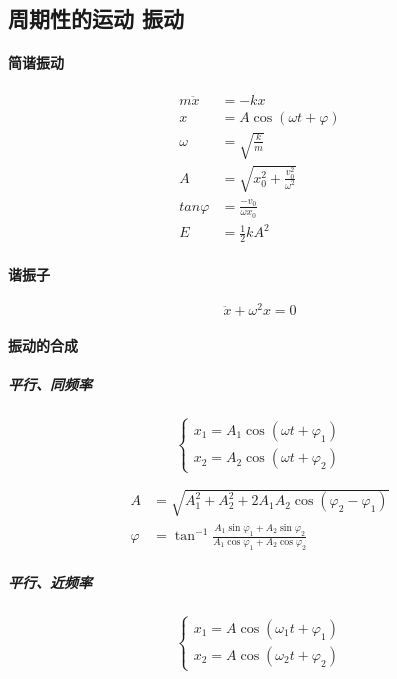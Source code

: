 \documentclass[12pt,a4paper]{article}
\numberwithin{equation}{section}
\begin{document}
\begin{CJK}{UTF8}{gbsn}
\section{周期性的运动 振动}
\paragraph{简谐振动}
\begin{align}
  m\ddot{x} &=-kx \\
  x&=A\cos(\omega t+\varphi) \\
  \omega &= \sqrt{\frac{k}{m}} \\
  A &= \sqrt{x_0^2+\frac{v_0^2}{\omega^2}} \\
  tan\varphi &= \frac{-v_0}{\omega x_0} \\
  E&=\frac{1}{2}kA^2
\end{align}

\paragraph{谐振子}
\begin{equation}
  \ddot{x}+\omega^2x=0
\end{equation}

\paragraph{振动的合成}
\subparagraph{平行、同频率}

\begin{equation}
  \left\{
    \begin{array}{ll}
      x_1=A_1\cos(\omega t+\varphi_1) \\
      x_2=A_2\cos(\omega t+\varphi_2)
    \end{array}
  \right.
\end{equation}


\begin{align}
  A&=\sqrt{A_1^2+A_2^2+2A_1A_2\cos(\varphi_2-\varphi_1)}\\
    \varphi&=\tan^{-1} \frac{A_1\sin \varphi_1+A_2\sin \varphi_2}{A_1 \cos \varphi_1+A_2 \cos \varphi_2}
\end{align}

\subparagraph{平行、近频率}

 \begin{equation}
  \left\{
    \begin{array}{ll}
      x_1=A\cos(\omega_1 t+\varphi_1) \\
      x_2=A\cos(\omega_2 t+\varphi_2)
    \end{array}
  \right.
 \end{equation}



\end{CJK}
\end{document}
